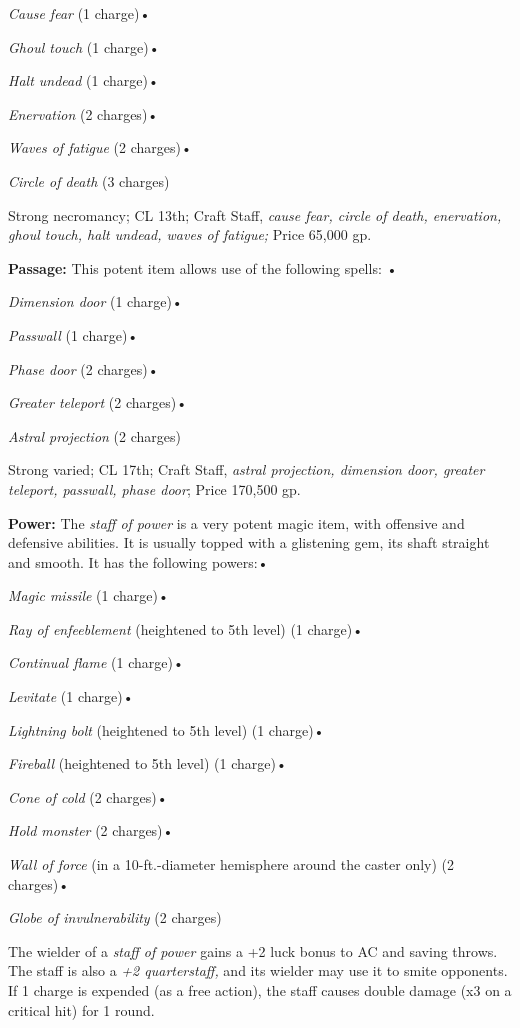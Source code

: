\documentclass{article}
\begin{document}
\textit{Cause fear }(1 charge)• 

\textit{Ghoul touch }(1 charge)• 

\textit{Halt undead }(1 charge)• 

\textit{Enervation }(2 charges)• 

\textit{Waves of fatigue }(2 charges)• 

\textit{Circle of death }(3 charges)

Strong necromancy; CL 13th; Craft Staff, \textit{cause fear, circle of death, enervation, 
ghoul touch, halt undead, waves of fatigue; }Price 65,000 gp.

\textbf{Passage:} This potent item allows use of the following spells: • 

\textit{Dimension door }(1 charge)• 

\textit{Passwall }(1 charge)• 

\textit{Phase door }(2 charges)• 

\textit{Greater teleport }(2 charges)• 

\textit{Astral projection }(2 charges)

Strong varied; CL 17th; Craft Staff, \textit{astral projection, dimension door, 
greater teleport, passwall, phase door}; Price 170,500 gp.

\textbf{Power:} The \textit{staff of power }is a very potent magic item, with offensive 
and defensive abilities. It is usually topped with a glistening gem, its shaft 
straight and smooth. It has the following powers:• 

\textit{Magic missile }(1 charge)• 

\textit{Ray of enfeeblement }(heightened to 5th level) (1 charge)• 

\textit{Continual flame }(1 charge)• 

\textit{Levitate }(1 charge)• 

\textit{Lightning bolt }(heightened to 5th level) (1 charge)• 

\textit{Fireball }(heightened to 5th level) (1 charge)• 

\textit{Cone of cold }(2 charges)• 

\textit{Hold monster }(2 charges)• 

\textit{Wall of force }(in a 10-ft.-diameter hemisphere around the caster only) 
(2 charges)• 

\textit{Globe of invulnerability }(2 charges)

The wielder of a \textit{staff of power }gains a +2 luck bonus to AC and saving 
throws. The staff is also a \textit{+2 quarterstaff, }and its wielder may use it 
to smite opponents. If 1 charge is expended (as a free action), the staff causes 
double damage (x3 on a critical hit) for 1 round.
\end{document}
